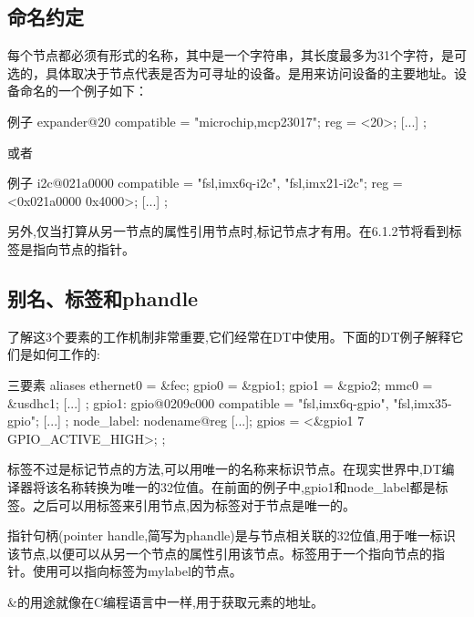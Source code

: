 \documentclass[lang=cn,newtx,10pt,scheme=chinese]{elegantbook}
\begin{document}
\subsection{命名约定}

每个节点都必须有形式的名称，其中是一个字符串，其长度最多为31个字符，是可选的，具体取决于节点代表是否为可寻址的设备。是用来访问设备的主要地址。设备命名的一个例子如下：

\begin{mycode}{例子}
expander@20 {
    compatible = "microchip,mcp23017";
    reg = <20>;
    [...]
};
\end{mycode}

或者

\begin{mycode}{例子}
i2c@021a0000 {
    compatible = "fsl,imx6q-i2c", "fsl,imx21-i2c";
    reg = <0x021a0000 0x4000>;
    [...]
};
\end{mycode}

另外,仅当打算从另一节点的属性引用节点时,标记节点才有用。在6.1.2节将看到标签是指向节点的指针。

\subsection{别名、标签和phandle}

了解这3个要素的工作机制非常重要,它们经常在DT中使用。下面的DT例子解释它们是如何工作的:

\begin{mycode}{三要素}
aliases {
    ethernet0 = &fec;
    gpio0 = &gpio1;
    gpio1 = &gpio2;
    mmc0 = &usdhc1;
    [...]
};
gpio1: gpio@0209c000 {
    compatible = "fsl,imx6q-gpio", "fsl,imx35-gpio";
    [...]
};
node_label: nodename@reg {
    [...];
    gpios = <&gpio1 7 GPIO_ACTIVE_HIGH>;
};
\end{mycode}

标签不过是标记节点的方法,可以用唯一的名称来标识节点。在现实世界中,DT编译器将该名称转换为唯一的32位值。在前面的例子中,gpio1和node\_label都是标签。之后可以用标签来引用节点,因为标签对于节点是唯一的。

指针句柄(pointer handle,简写为phandle)是与节点相关联的32位值,用于唯一标识该节点,以便可以从另一个节点的属性引用该节点。标签用于一个指向节点的指针。使用可以指向标签为mylabel的节点。

\begin{marker}
    \&的用途就像在C编程语言中一样,用于获取元素的地址。
\end{marker}
\end{document}
